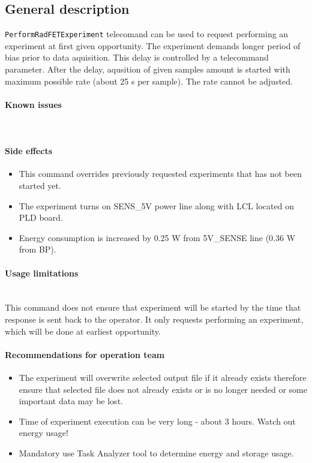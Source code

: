 

\subsection{General description}
\texttt{PerformRadFETExperiment} telecomand can be used to request performing an \radfet 
experiment at first given opportunity. The experiment demands longer period of bias prior to data aquisition. 
This delay is controlled by a telecommand parameter. After the delay, aqusition of given samples amount is started 
with maximum possible rate (about 25 s per sample). The rate cannot be adjusted.



\paragraph{Known issues} \mbox{} \\
\None

\paragraph{Side effects} \mbox{}
\begin{itemize}
    \item This command overrides previously requested experiments that has not been started yet. 
    \item The experiment turns on SENS_5V power line along with \radfet LCL located on PLD board.
    \item Energy consumption is increased by 0.25 W from 5V_SENSE line (0.36 W from BP).
\end{itemize}


\paragraph{Usage limitations} \mbox{} \\
This command does not ensure that \radfet experiment will be started by the time that 
response is sent back to the operator. It only requests performing an experiment, which 
will be done at earliest opportunity.

\paragraph{Recommendations for operation team} \mbox{}
\begin{itemize}
    \item The experiment will overwrite selected output file if it already exists therefore ensure 
          that selected file does not already exists or is no longer needed or some important data
          may be lost.
    \item Time of experiment execution can be very long - about 3 hours. Watch out energy usage!
    \item Mandatory use Task Analyzer tool to determine energy and storage usage.

\end{itemize}

